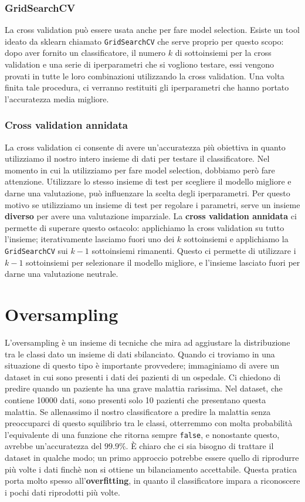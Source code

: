 \documentclass[12pt, twoside, letterpaper]{report}
\begin{document}
				\subsubsection{GridSearchCV}
					La cross validation può essere usata anche per fare model selection. Esiste un tool ideato da sklearn \cite{sklearn} chiamato \texttt{GridSearchCV} che serve proprio per questo scopo: dopo aver fornito un classificatore, il numero $k$ di sottoinsiemi per la cross validation e una serie di iperparametri che si vogliono testare, essi vengono provati in tutte le loro combinazioni utilizzando la cross validation. Una volta finita tale procedura, ci verranno restituiti gli iperparametri che hanno portato l'accuratezza media migliore.
				
				\subsubsection{Cross validation annidata}	
					La cross validation ci consente di avere un'accuratezza più obiettiva in quanto utilizziamo il nostro intero insieme di dati per testare il classificatore. Nel momento in cui la utilizziamo per fare model selection, dobbiamo però fare attenzione. Utilizzare lo stesso insieme di test per scegliere il modello migliore e darne una valutazione, può influenzare la scelta degli iperparametri. Per questo motivo se utilizziamo un insieme di test per regolare i parametri, serve un insieme \textbf{diverso} per avere una valutazione imparziale. La \textbf{cross validation annidata} ci permette di superare questo ostacolo: applichiamo la cross validation su tutto l'insieme; iterativamente lasciamo fuori uno dei $k$ sottoinsiemi e applichiamo la \texttt{GridSearchCV} sui $k-1$ sottoinsiemi rimanenti. Questo ci permette di utilizzare i $k-1$ sottoinsiemi per selezionare il modello migliore, e l'insieme lasciato fuori per darne una valutazione neutrale.
				
	
		\section{Oversampling}
			L'oversampling è un insieme di tecniche che mira ad aggiustare la distribuzione tra le classi dato un insieme di dati sbilanciato. Quando ci troviamo in una situazione di questo tipo è importante provvedere; immaginiamo di avere un dataset in cui sono presenti i dati dei pazienti di un ospedale. Ci chiedono di predire quando un paziente ha una grave malattia rarissima. Nel dataset, che contiene 10000 dati, sono presenti solo 10 pazienti che presentano questa malattia. Se allenassimo il nostro classificatore a predire la malattia senza preoccuparci di questo squilibrio tra le classi, otterremmo con molta probabilità l'equivalente di una funzione che ritorna sempre \texttt{false}, e nonostante questo, avrebbe un'accuratezza del $99.9\%$. È chiaro che ci sia bisogno di trattare il dataset in qualche modo; un primo approccio potrebbe essere quello di riprodurre più volte i dati  finchè non si ottiene un bilanciamento accettabile. Questa pratica porta molto spesso all'\textbf{overfitting}, in quanto il classificatore impara a riconoscere i pochi dati riprodotti più volte.
			
\end{document}

